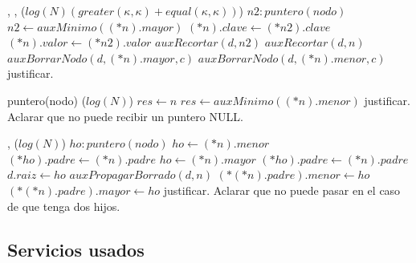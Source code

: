 {   ,
    ,
    }
{}
{\bigo($log(N)(greater(\kappa, \kappa)+equal(\kappa, \kappa))$)}
{   
            \var $n2 : puntero(nodo)$
            \State $n2 \gets auxMinimo((*n).mayor)$
            \State $(*n).clave \gets (*n2).clave$
            \State $(*n).valor \gets (*n2).valor$
            \State $auxRecortar(d, n2)$
        \Else
            \State $auxRecortar(d, n)$
        \EndIf
    \Else
            \State $auxBorrarNodo(d, (*n).mayor, c)$
        \Else
            \State $auxBorrarNodo(d, (*n).menor, c)$
        \EndIf
    \EndIf
}
{   \cuidado justificar. }

{   }
{puntero(nodo)}
{\bigo($log(N)$)}
{   
        \State $res \gets n$
    \Else
        \State $res \gets auxMinimo((*n).menor)$
    \EndIf
}
{   \cuidado justificar. Aclarar que no puede recibir un puntero NULL. }

{   ,
    }
{}
{\bigo($log(N)$)}
{   \var $ho : puntero(nodo)$
        \State $ho \gets (*n).menor$
        \State $(*ho).padre \gets (*n).padre$
    \EndIf
        \State $ho \gets (*n).mayor$
        \State $(*ho).padre \gets (*n).padre$
    \EndIf
        \State $d.raiz \gets ho$
    \Else
        \State $auxPropagarBorrado(d, n)$
            \State $(*(*n).padre).menor \gets ho$
        \Else
            \State $(*(*n).padre).mayor \gets ho$
        \EndIf
    \EndIf
}
{   \cuidado justificar. Aclarar que no puede pasar en el caso de que tenga dos hijos. }



\subsection{Servicios usados}


